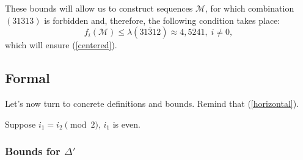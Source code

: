 \documentclass[a4paper, 12pt]{article}
\let\oldref\ref
\renewcommand{\ref}[1]{(\oldref{#1})}
\theoremstyle{definition}
\theoremstyle{definition}
\theoremstyle{proposition}
\theoremstyle{lemma}
\newcommand{\M}{\mathcal{M}}
\newcommand{\D}{\Delta}
\begin{document}
These bounds will allow us to construct sequences $\M$,
for which combination $(31313)$ is forbidden and, therefore,
the following condition takes place:
\begin{equation}
	f_i(\M) \leqslant \lambda(\overline{31312}) \approx 4,5241, \;
	i \ne 0,
\end{equation}
which will ensure \ref{centered}.

\subsection{Formal}

Let's now turn to concrete definitions and bounds. Remind that \ref{horizontal}.

Suppose $i_1 = i_2 \pmod 2$, $i_1$ is even.

\subsubsection{Bounds for $\D'$}
\end{document}
